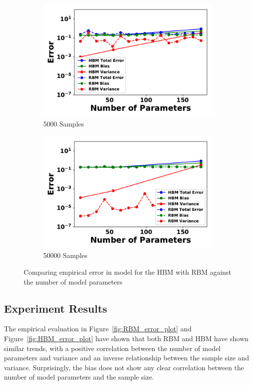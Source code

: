 \documentclass[letterpaper]{article} %
\begin{document}
\begin{figure}[ht]
\begin{subfigure}[b]{0.495\textwidth}
              \includegraphics[width=\textwidth]{./HBM_vs_RBM_Error_vs_NParameters_Samples5000-eps-converted-to.pdf}
              \caption{5000 Samples}
          \end{subfigure}
          \begin{subfigure}[b]{0.495\textwidth}
              \centering
              \includegraphics[width=\textwidth]{./HBM_vs_RBM_Error_vs_NParameters_Samples50000-eps-converted-to.pdf}
              \caption{50000 Samples}
          \end{subfigure}
          \caption{Comparing empirical error in model for the HBM with RBM against the number of model parameters} \label{fig:RBM_vs_HBM}
        \end{figure}

	\subsection{Experiment Results}
		The empirical evaluation in Figure~\ref{fig:RBM_error_plot} and Figure~\ref{fig:HBM_error_plot} have shown that both RBM and HBM have shown similar trends, with a positive correlation between the number of model parameters and variance and an inverse relationship between the sample size and variance. Surprisingly, the bias does not show any clear correlation between the number of model parameters and the sample size.
        
\end{document}
